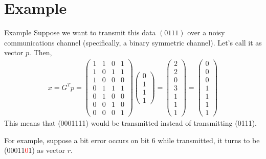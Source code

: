 \documentclass[10pt]{beamer}
\begin{document}
\section{Example}
\begin{frame}{Example}
    Suppose we want to transmit this data $(0111)$ over a noisy communications channel (specifically, a binary symmetric channel). Let's call it as vector $p$. Then,
    \begin{align*}
        x=G^T p = 
        \begin{pmatrix}
        1&1&0&1\\
        1&0&1&1\\
        1&0&0&0\\
        0&1&1&1\\
        0&1&0&0\\
        0&0&1&0\\
        0&0&0&1
        \end{pmatrix}
        \begin{pmatrix}
        0\\
        1\\
        1\\
        1
        \end{pmatrix}
        =
        \begin{pmatrix}
        2\\
        2\\
        0\\
        3\\
        1\\
        1\\
        1
        \end{pmatrix}
        =
        \begin{pmatrix}
        0\\
        0\\
        0\\
        1\\
        1\\
        1\\
        1
        \end{pmatrix}
    \end{align*}
This means that (0001111) would be transmitted instead of transmitting (0111).

For example, suppose a bit error occurs on bit 6 while transmitted, it turns to be (00011\textcolor{red}{0}1) as vector $r$.
\end{frame}
\end{document}
